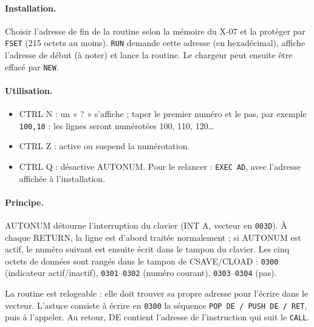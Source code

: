 \documentclass[a4paper,10pt]{article}
\newcommand{\hex}[1]{\texttt{#1}}
\begin{document}
\paragraph{Installation.} Choisir l'adresse de fin de la routine selon la
mémoire du X-07 et la protéger par \texttt{FSET} (215 octets au moins).
\texttt{RUN} demande cette adresse (en hexadécimal), affiche l'adresse de
début (à noter) et lance la routine. Le chargeur peut ensuite être effacé
par \texttt{NEW}.

\paragraph{Utilisation.}
\begin{itemize}
  \item CTRL N : un « ? » s'affiche ; taper le premier numéro et le pas, par
        exemple \texttt{100,10} : les lignes seront numérotées 100, 110,
        120\dots
  \item CTRL Z : active ou suspend la numérotation.
  \item CTRL Q : désactive AUTONUM. Pour le relancer : \texttt{EXEC AD}, avec
        l'adresse affichée à l'installation.
\end{itemize}

\paragraph{Principe.} AUTONUM détourne l'interruption du clavier (INT A,
vecteur en \hex{003D}). À chaque RETURN, la ligne est d'abord traitée
normalement ; si AUTONUM est actif, le numéro suivant est ensuite écrit dans
le tampon du clavier. Les cinq octets de données sont rangés dans le tampon
de CSAVE/CLOAD : \hex{0300} (indicateur actif/inactif), \hex{0301}--\hex{0302}
(numéro courant), \hex{0303}--\hex{0304} (pas).

La routine est relogeable : elle doit trouver sa propre adresse pour
l'écrire dans le vecteur. L'astuce consiste à écrire en \hex{0300} la
séquence \texttt{POP DE / PUSH DE / RET}, puis à l'appeler. Au retour, DE
contient l'adresse de l'instruction qui suit le \texttt{CALL}.
\end{document}
